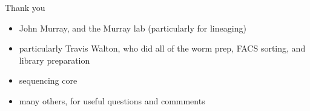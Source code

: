 \documentclass[serif,9pt]{beamer}
\begin{document}
\begin{frame}{Thank you}

\begin{itemize}

\item John Murray, and the Murray lab (particularly for lineaging)

\item particularly Travis Walton, who did all of the worm prep, FACS sorting,
and library preparation

\item sequencing core

\item many others, for useful questions and commments

\end{itemize}

\end{frame}
\end{document}
